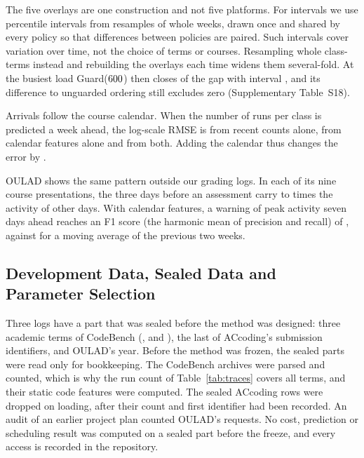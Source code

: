 The five overlays are one construction and not five platforms. For intervals we use
 percentile intervals from  resamples of whole weeks, drawn once
and shared by every policy so that differences between policies are paired. Such intervals
cover variation over time, not the choice of terms or courses. Resampling whole
class-terms instead and rebuilding the overlays each time widens them several-fold. At the
busiest load Guard($600$) then closes  of the gap with interval
\devnum{[0.328, 0.913]}, and its difference to unguarded ordering still excludes zero
(Supplementary Table~S18).

Arrivals follow the course calendar. When the number of runs per class is predicted a week
ahead, the log-scale RMSE is  from recent counts alone,  from
calendar features alone and  from both. Adding the calendar thus changes the
error by .

OULAD shows the same pattern outside our grading logs. In each of its nine course
presentations, the three days before an assessment carry  to 
times the activity of other days. With calendar features, a warning of peak activity seven
days ahead reaches an F1 score (the harmonic mean of precision and recall) of
, against  for a moving average of the previous two weeks.

\subsection{Development Data, Sealed Data and Parameter Selection}
\label{sec:sealed}
\label{sec:exp_prov}

Three logs have a part that was sealed before the method was designed: three academic
terms of CodeBench (,  and ), the last
 of ACcoding's submission identifiers, and OULAD's  year. Before
the method was frozen, the sealed parts were read only for bookkeeping. The CodeBench
archives were parsed and counted, which is why the run count of Table~\ref{tab:traces}
covers all  terms, and their static code features were computed. The
 sealed ACcoding rows were dropped on loading, after their count and first
identifier had been recorded. An audit of an earlier project plan counted OULAD's
 requests. No cost, prediction or scheduling result was computed on a sealed
part before the freeze, and every access is recorded in the repository.


